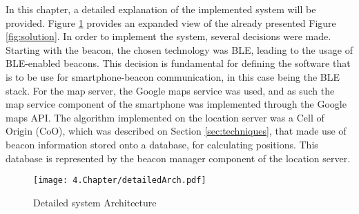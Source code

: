 
\label{cap:implement}


In this chapter, a detailed explanation of the implemented system will be provided. Figure \ref{fig:implementation} provides an expanded view of the already presented Figure \ref{fig:solution}. In order to implement the system, several decisions were made. Starting with the beacon, the chosen technology was \ac{BLE}, leading to the usage of \ac{BLE}-enabled beacons. This decision is fundamental for defining the software that is to be use for smartphone-beacon communication, in this case being the \ac{BLE} stack. For the map server, the Google maps service was   
used, and as such the map service component of the smartphone was implemented through the Google maps API. The algorithm implemented on the location server was a Cell of Origin (CoO), which was described on Section \ref{sec:techniques}, that made use of beacon information stored onto a database, for calculating positions. This database is represented by the beacon manager component of the location server. 

\begin{figure}[H]
	\centering
		\texttt{[image: 4.Chapter/detailedArch.pdf]}
	\caption[Detailed system Architecture]{Detailed system Architecture}
	\label{fig:implementation}
\end{figure}







\cleardoublepage
